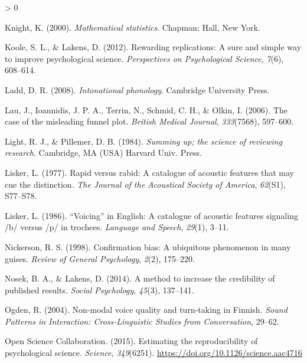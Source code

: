 \documentclass[
  english,
  man,floatsintext]{apa6}
\newlength{\cslhangindent}
\newenvironment{CSLReferences}[2] %
 {%
  \setlength{\parindent}{0pt}
  \ifodd #1 \everypar{\setlength{\hangindent}{\cslhangindent}}\ignorespaces\fi
  \ifnum #2 > 0
  \setlength{\parskip}{#2\baselineskip}
  \fi
 }%
 {}
\begin{document}
\begin{CSLReferences}{1}{0}
\leavevmode\hypertarget{ref-knight2000}{}%
Knight, K. (2000). \emph{Mathematical statistics}. Chapman; Hall, New York.

\leavevmode\hypertarget{ref-koole2012rewarding}{}%
Koole, S. L., \& Lakens, D. (2012). Rewarding replications: A sure and simple way to improve psychological science. \emph{Perspectives on Psychological Science}, \emph{7}(6), 608--614.

\leavevmode\hypertarget{ref-ladd2008intonational}{}%
Ladd, D. R. (2008). \emph{Intonational phonology}. Cambridge University Press.

\leavevmode\hypertarget{ref-lau2006}{}%
Lau, J., Ioannidis, J. P. A., Terrin, N., Schmid, C. H., \& Olkin, I. (2006). The case of the misleading funnel plot. \emph{British Medical Journal}, \emph{333}(7568), 597--600.

\leavevmode\hypertarget{ref-light1984}{}%
Light, R. J., \& Pillemer, D. B. (1984). \emph{Summing up; the science of reviewing research}. Cambridge, MA (USA) Harvard Univ. Press.

\leavevmode\hypertarget{ref-lisker1977rapid}{}%
Lisker, L. (1977). Rapid versus rabid: A catalogue of acoustic features that may cue the distinction. \emph{The Journal of the Acoustical Society of America}, \emph{62}(S1), S77--S78.

\leavevmode\hypertarget{ref-lisker1986voicing}{}%
Lisker, L. (1986). {``Voicing''} in {E}nglish: A catalogue of acoustic features signaling /b/ versus /p/ in trochees. \emph{Language and Speech}, \emph{29}(1), 3--11.

\leavevmode\hypertarget{ref-nickerson1998confirmation}{}%
Nickerson, R. S. (1998). Confirmation bias: A ubiquitous phenomenon in many guises. \emph{Review of General Psychology}, \emph{2}(2), 175--220.

\leavevmode\hypertarget{ref-nosek2014method}{}%
Nosek, B. A., \& Lakens, D. (2014). A method to increase the credibility of published results. \emph{Social Psychology}, \emph{45}(3), 137--141.

\leavevmode\hypertarget{ref-ogden2004}{}%
Ogden, R. (2004). Non-modal voice quality and turn-taking in {F}innish. \emph{Sound Patterns in Interaction: Cross-Linguistic Studies from Conversation}, 29--62.

\leavevmode\hypertarget{ref-open2015estimating}{}%
Open Science Collaboration. (2015). Estimating the reproducibility of psychological science. \emph{Science}, \emph{349}(6251). \url{https://doi.org/10.1126/science.aac4716}


\end{CSLReferences}
\end{document}
